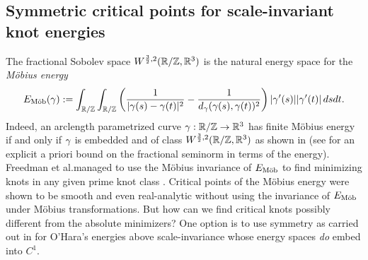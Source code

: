 \subsection{Symmetric critical points for scale-invariant knot energies}
The fractional Sobolev space $W^{\frac32, 2}(\mathbb{R}/\mathbb{Z},\mathbb{R}^3)$ is the natural
energy space for  the 
\emph{M\"obius energy}
\begin{equation}\label{eq:emob}
E_\textnormal{M\"ob}(\gamma):=\int_{\mathbb{R}/\mathbb{Z}}\int_{\mathbb{R}/\mathbb{Z}}\left(
\frac1{|\gamma(s)-\gamma(t)|^2}-
\frac{1}{d_\gamma(\gamma(s),\gamma(t))^2}\right)|\gamma'(s)||\gamma'(t)|\,dsdt.
\end{equation}
Indeed, an arclength parametrized
curve $\gamma:\mathbb{R}/\mathbb{Z}\to\mathbb{R}^3$ has finite M\"obius energy  
if and only if 
$\gamma$ is embedded and of
class $W^{\frac32,2}(\mathbb{R}/\mathbb{Z},\mathbb{R}^3)$ as shown in \cite{blatt_2012a} 
(see 
\cite[Theorem~3.2 (i)]{gilsbach-vdm_2018} for an explicit a priori bound
on the fractional seminorm in terms of  the energy). 
Freedman et al.\@ managed to
use the M\"obius invariance of ${E_\textnormal{M\"ob}}$ to find minimizing knots in any given prime
knot class \cite[Theorem~4.3]{freedman-etal_1994}.
Critical points of the M\"obius energy were
shown to be smooth and even real-analytic 
\cite{blatt-etal_2016,blatt-vorderobermeier_2019} 
without using the invariance of ${E_\textnormal{M\"ob}}$ under 
M\"obius transformations. 
But how can we find critical knots  possibly different from the absolute minimizers? 
One option is to use symmetry as carried out in \cite{gilsbach-vdm_2018} for 
O'Hara's
energies above scale-invariance whose energy spaces \emph{do} 
embed into $C^1$.


